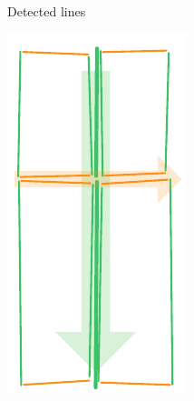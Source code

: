 \begin{figure}
\begin{subfigure}[b]{0.48\linewidth}
		\caption{Detected lines}%
		\label{fig:lineclust:1}
	\end{subfigure}
	\quad
 	\begin{subfigure}[b]{0.48\linewidth}
		\includegraphics[angle=90,width=\linewidth]{figs/line-clustering/slice2.pdf}

\end{subfigure}
\end{figure}
